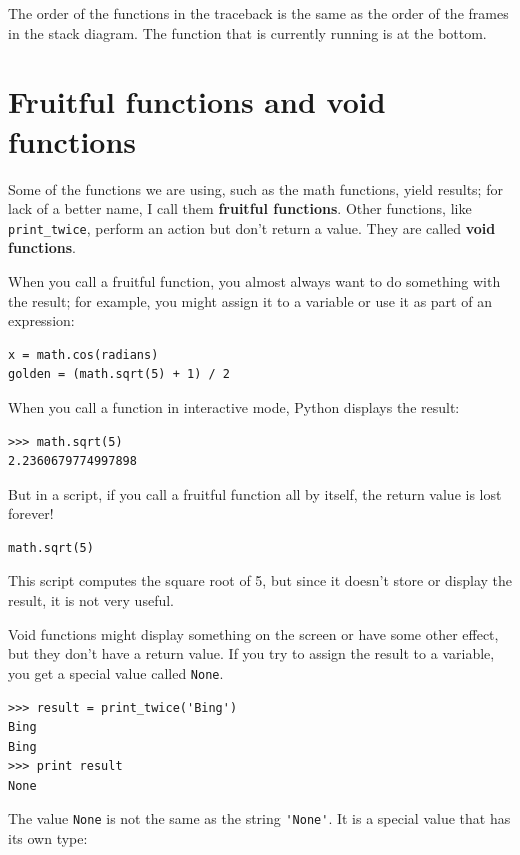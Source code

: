\documentclass[10pt]{book}
\begin{document}
The order of the functions in the traceback is the same as the
order of the frames in the stack diagram.  The function that is
currently running is at the bottom.


\section{Fruitful functions and void functions}

Some of the functions we are using, such as the math functions, yield
results; for lack of a better name, I call them {\bf fruitful
  functions}.  Other functions, like \verb"print_twice", perform an
action but don't return a value.  They are called {\bf void
  functions}.

When you call a fruitful function, you almost always
want to do something with the result; for example, you might
assign it to a variable or use it as part of an expression:

\begin{verbatim}
x = math.cos(radians)
golden = (math.sqrt(5) + 1) / 2
\end{verbatim}
%
When you call a function in interactive mode, Python displays
the result:

\begin{verbatim}
>>> math.sqrt(5)
2.2360679774997898
\end{verbatim}
%
But in a script, if you call a fruitful function all by itself,
the return value is lost forever!

\begin{verbatim}
math.sqrt(5)
\end{verbatim}
%
This script computes the square root of 5, but since it doesn't store
or display the result, it is not very useful.

Void functions might display something on the screen or have some
other effect, but they don't have a return value.  If you try to
assign the result to a variable, you get a special value called
{\tt None}.

\begin{verbatim}
>>> result = print_twice('Bing')
Bing
Bing
>>> print result
None
\end{verbatim}
%
The value {\tt None} is not the same as the string \verb"'None'". 
It is a special value that has its own type:
\end{document}
